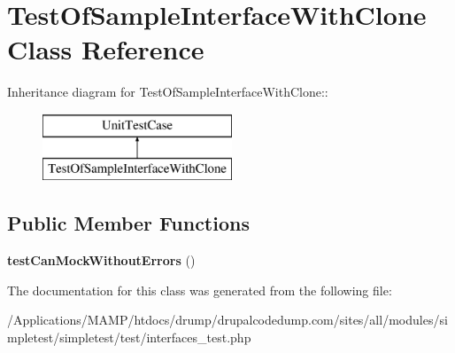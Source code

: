 \hypertarget{class_test_of_sample_interface_with_clone}{
\section{TestOfSampleInterfaceWithClone Class Reference}
\label{class_test_of_sample_interface_with_clone}
}
Inheritance diagram for TestOfSampleInterfaceWithClone::\begin{figure}[H]
\begin{center}
\leavevmode
\includegraphics[height=2cm]{class_test_of_sample_interface_with_clone}
\end{center}
\end{figure}
\subsection*{Public Member Functions}
\begin{DoxyCompactItemize}
\item 
\hypertarget{class_test_of_sample_interface_with_clone_a931ba4cd04835b0b0175fbd1be6e7d9d}{
{\bfseries testCanMockWithoutErrors} ()}
\label{class_test_of_sample_interface_with_clone_a931ba4cd04835b0b0175fbd1be6e7d9d}

\end{DoxyCompactItemize}


The documentation for this class was generated from the following file:\begin{DoxyCompactItemize}
\item 
/Applications/MAMP/htdocs/drump/drupalcodedump.com/sites/all/modules/simpletest/simpletest/test/interfaces\_\-test.php\end{DoxyCompactItemize}
